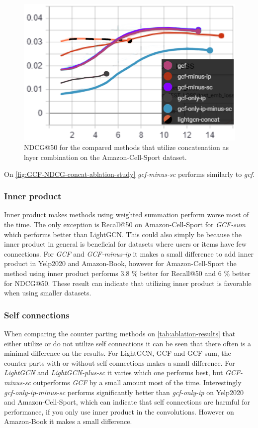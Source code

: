 \begin{figure}[h!]
    \includegraphics[width=\linewidth]{figures/amazon-cell-sport-gcf-ndcg.png}
    \caption{NDCG@50 for the compared methods that utilize concatenation as layer combination on the Amazon-Cell-Sport dataset.}
    \label{fig:GCF-NDCG-concat-ablation-study-Amazon-Cell-Sport}
\end{figure}
On \autoref{fig:GCF-NDCG-concat-ablation-study} \textit{gcf-minus-sc} performs similarly to \textit{gcf}.
\subsubsection{Inner product}
Inner product makes methods using weighted summation perform worse most of the time.
The only exception is Recall@50 on Amazon-Cell-Sport for \textit{GCF-sum} which performs better than LightGCN.
This could also simply be because the inner product in general is beneficial for datasets where users or items have few connections.
For \textit{GCF} and \textit{GCF-minus-ip} it makes a small difference to add inner product in Yelp2020 and Amazon-Book, however for Amazon-Cell-Sport the method using inner product performs 3.8 \% better for Recall@50 and 6 \% better for NDCG@50.
These result can indicate that utilizing inner product is favorable when using smaller datasets.

\subsubsection{Self connections}
When comparing the counter parting methods on \autoref{tab:ablation-results} that either utilize or do not utilize self connections it can be seen that there often is a minimal difference on the results.
For LightGCN, GCF and GCF sum, the counter parts with or without self connections makes a small difference.
For \textit{LightGCN} and \textit{LightGCN-plus-sc} it varies which one performs best, but \textit{GCF-minus-sc} outperforms \textit{GCF} by a small amount most of the time.
Interestingly \textit{gcf-only-ip-minus-sc} performs significantly better than \textit{gcf-only-ip} on Yelp2020 and Amazon-Cell-Sport, which can indicate that self connections are harmful for performance, if you only use inner product in the convolutions.
However on Amazon-Book it makes a small difference.

